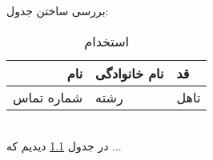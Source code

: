 \documentclass{book}
\author{علی}
\begin{document}
	\maketitle
	\tableofcontents
	\singlespacing
	\Time
\chapter{}	
\BNaz
بررسی ساختن جدول:
\begin{table}[h!]

\begin{center}
 \begin{tabular}{|r|p{2cm}||l|}
	\hline
	\textbf{نام} &
	\centering
	 نام خانوادگی & قد \\
	\hline
شماره تماس &
\centering
 رشته & تاهل\\
	\hline
 \end{tabular}
\end{center}
\caption{استخدام}
\label{Tab1}
\end{table}
\\
	در جدول \ref{Tab1} دیدیم که ...
\end{document}
